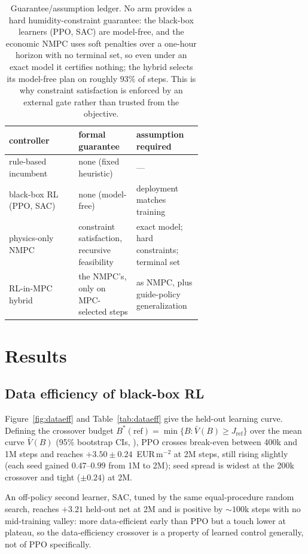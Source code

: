 \documentclass[11pt]{article}
\begin{document}
\begin{table}[t]
  \centering\small
  \caption{Guarantee/assumption ledger. No arm provides a hard
  humidity-constraint guarantee: the black-box learners (PPO, SAC) are model-free, and the
  economic NMPC uses soft penalties over a one-hour horizon with no terminal set,
  so even under an exact model it certifies nothing; the hybrid selects its
  model-free plan on roughly $93\%$ of steps. This is why constraint satisfaction
  is enforced by an external gate rather than trusted from the objective.}
  \label{tab:ledger}
  \begin{tabular}{@{}l p{0.30\linewidth} p{0.34\linewidth}@{}}
    \toprule
    controller & formal guarantee & assumption required \\
    \midrule
    rule-based incumbent & none (fixed heuristic) & --- \\
    black-box RL (PPO, SAC) & none (model-free) & deployment matches training \\
    physics-only NMPC & constraint satisfaction, recursive feasibility & exact model; hard constraints; terminal set \\
    RL-in-MPC hybrid & the NMPC's, only on MPC-selected steps & as NMPC, plus guide-policy generalization \\
    \bottomrule
  \end{tabular}
\end{table}

\section{Results}\label{sec:results}

\subsection{Data efficiency of black-box RL}

Figure~\ref{fig:dataeff} and Table~\ref{tab:dataeff} give the held-out learning curve. Defining the crossover budget $B^{*}(\mathrm{ref}) = \min\{B : \bar V(B) \ge J_{\mathrm{ref}}\}$
over the mean curve $\bar V(B)$ (95\% bootstrap CIs, \citealp{efron1979bootstrap}), PPO
crosses break-even between 400k and 1M steps and reaches $+3.50 \pm 0.24$~EUR\,m$^{-2}$
at 2M steps, still rising slightly (each seed gained $0.47$--$0.99$ from 1M to 2M); seed
spread is widest at the 200k crossover and tight ($\pm 0.24$) at 2M.

An off-policy second learner, SAC, tuned by the same equal-procedure random search, reaches $+3.21$ held-out net at 2M and is positive by ${\sim}100$k steps with no mid-training valley: more data-efficient early than PPO but a touch lower at plateau, so the data-efficiency crossover is a property of learned control generally, not of PPO specifically.
\end{document}
